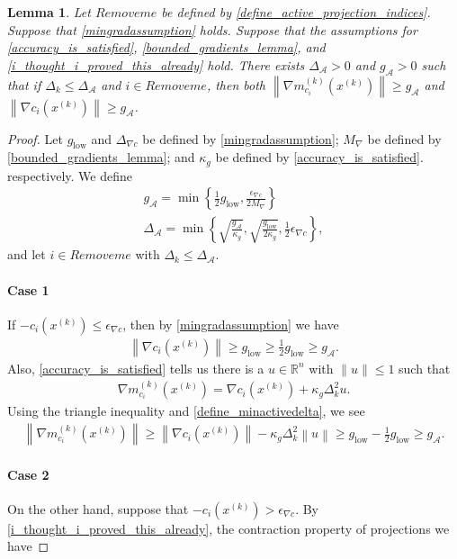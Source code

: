 \documentclass{article}
\newtheorem{lemma}[theorem]{Lemma}
\theoremstyle{case}
\numberwithin{theorem}{subsection}
\newcommand{\dk}{\Delta_k}
\newcommand{\gmcik}{{\nabla m_{c_i}^{(k)}\left(\xk\right)}}
\newcommand{\maxgrad}{{M_{\nabla}}}
\newcommand{\minactivegraddelta}{{\Delta_{\mathcal A}}}
\newcommand{\minactivegrad}{{ g_{\mathcal A} }}
\newcommand{\mingraddelta}{{\Delta_{\nabla c}}}
\newcommand{\mingradepsilon}{{\epsilon_{\nabla c}}}
\newcommand{\mingrad}{{ g_{\textrm{low}} }}
\newcommand{\Rn}{\mathbb R^n}
\newcommand{\xk}{x^{(k)}}
\newcommand{\activeprojk}{{Remove me}}
\begin{document}
\begin{lemma}
\label{active_gradients_bounded_below}
Let $\activeprojk$ be defined by \cref{define_active_projection_indices}.
Suppose that \cref{mingradassumption} holds.
Suppose that the assumptions for 
\cref{accuracy_is_satisfied}, \cref{bounded_gradients_lemma}, and \cref{i_thought_i_proved_this_already} hold.
There exists $\minactivegraddelta > 0$ and $\minactivegrad > 0$ such that if 
$\dk \le \minactivegraddelta$ and $i \in \activeprojk$, then both
$\left\|\gmcik\right\| \ge \minactivegrad$
and
$\left\|\nabla c_i\left(\xk\right)\right\| \ge \minactivegrad$.
\end{lemma}
\begin{proof}
Let 
$\mingrad$ and $\mingraddelta$
be defined by
\cref{mingradassumption};
$\maxgrad$ be defined by \cref{bounded_gradients_lemma};
and $\kappa_g$ be defined by \cref{accuracy_is_satisfied}.
respectively.
We define
\begin{align}
\minactivegrad = \min\left\{\frac 1 2 \mingrad, \frac {\mingradepsilon} {2 \maxgrad}  \right\} \label{define_minactivegrad} \\
\minactivegraddelta = \min\left\{\sqrt{\frac{\minactivegrad}{\kappa_g}}, \sqrt{\frac{\mingrad}{2\kappa_g}}, \frac 1 2 \mingradepsilon \right\}\label{define_minactivedelta}
,
\end{align}
and let $i \in \activeprojk$ with $\dk \le \minactivegraddelta$.
\paragraph{Case 1}
If $-c_i\left(\xk\right) \le \mingradepsilon$, then by \cref{mingradassumption} we have 
\begin{align*}
\left\|\nabla c_i\left(\xk\right)\right\| \ge \mingrad \ge \frac 1 2 \mingrad \ge \minactivegrad.
\end{align*}
Also, \cref{accuracy_is_satisfied} tells us there is a $u \in \Rn$ with $\|u\| \le 1$ such that
\begin{align}
\gmcik = \nabla c_i\left(\xk\right) + \kappa_g \dk^2 u. \label{mag_acc}
\end{align}
Using the triangle inequality and \cref{define_minactivedelta}, we see
\begin{align*}
\left\|\gmcik \right\| \ge \left\|\nabla c_i\left(\xk\right)\right\| - \kappa_g \dk^2 \left\|u\right\|
\ge \mingrad - \frac 1 2 \mingrad \ge \minactivegrad.
\end{align*}

\paragraph{Case 2}
On the other hand, suppose that $-c_i\left(\xk\right) > \mingradepsilon$.
By \cref{i_thought_i_proved_this_already}, the contraction property of projections we have


\end{proof}
\end{document}
